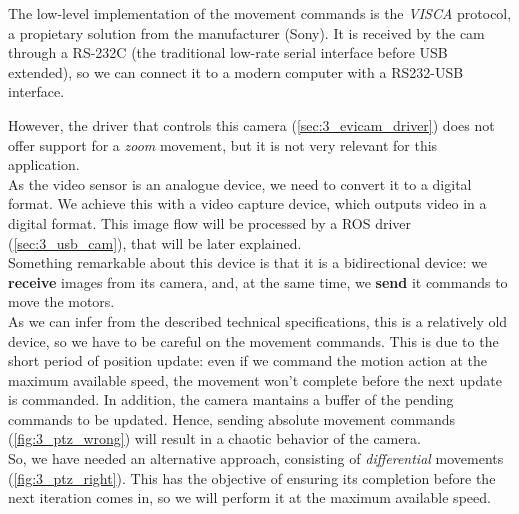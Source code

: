		The low-level implementation of the movement commands is the \emph{VISCA} protocol, a propietary solution from the manufacturer (Sony). It is received by the cam through a RS-232C (the traditional low-rate serial interface before USB extended), so we can connect it to a modern computer with a RS232-USB interface.

		However, the driver that controls this camera (\ref{sec:3_evicam_driver}) does not offer support for a \emph{zoom} movement, but it is not very relevant for this application.\\

		As the video sensor is an analogue device, we need to convert it to a digital format. We achieve this with a video capture device, which outputs video in a digital format. This image flow will be processed by a ROS driver (\autoref{sec:3_usb_cam}), that will be later explained.\\

		Something remarkable about this device is that it is a bidirectional device: we \textbf{receive} images from its camera, and, at the same time, we \textbf{send} it commands to move the motors.\\
		
		As we can infer from the described technical specifications, this is a relatively old device, so we have to be careful on the movement commands. This is due to the short period of position update: even if we command the motion action at the maximum available speed, the movement won't complete before the next update is commanded. In addition, the camera mantains a buffer of the pending commands to be updated. Hence, sending absolute movement commands (\autoref{fig:3_ptz_wrong}) will result in a chaotic behavior of the camera.\\
		
		So, we have needed an alternative approach, consisting of \emph{differential} movements (\autoref{fig:3_ptz_right}). This has the objective of ensuring its completion before the next iteration comes in, so we will perform it at the maximum available speed.

